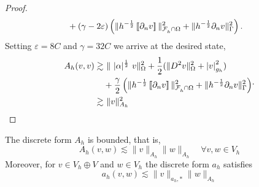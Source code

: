 \begin{proof}
\begin{equation}
\begin{split}
                       & + (\gamma - 2\varepsilon  )\left( \|h^{-\frac{1}{2}}  \left[\!\left[  \partial _{n} v  \right]\!\right]\|_{\mathcal{F} _{h}^{}\cap \Omega   }^{ 2 } + \| h^{-\frac{1}{2}} \partial _{n} v \|_{ \Gamma  }^{ 2} \right)        .
        \end{split}
    \end{equation}
    Setting $\varepsilon = 8C$ and $\gamma = 32C $ we arrive at the desired state,
    \begin{equation}
        \begin{split}
           A_{h}( v,v)  \gtrsim & \   \| \ |\alpha|^{\frac{1}{2}} \    v  \|_{  \Omega   }^{2} + \frac{1}{2}  (\| D^2 v \|_{ \Omega  }^{ 2 }  + \left\lvert  v  \right\rvert _{ g_{h} }^{2  } )  \\
                       & + \frac{\gamma }{2}\left( \|h^{-\frac{1}{2}}  \left[\!\left[  \partial _{n} v  \right]\!\right]\|_{\mathcal{F} _{h}^{}\cap \Omega   }^{ 2 } + \| h^{-\frac{1}{2}} \partial _{n} v \|_{ \Gamma  }^{ 2} \right) \\
                        \gtrsim & \  \| v \|_{ A_{h} }^{2  }
        \end{split}
.
    \end{equation}
\end{proof}


\begin{lemma}
    \label{lemma:bi_Ah_bounded}
    The discrete form $A_{h}$ is bounded, that is,
    \begin{equation}
    \label{eq:bi_A_h_bounded}
     A_{h}( v,w) \lesssim \| v \|_{A_{h}  }^{  }\| w \|_{A_{h}  }^{  } \quad   \forall v,w \in V_{h}
    \end{equation}
    Moreover, for $v \in V_{h} \oplus V$  and $w \in V_{h}$ the discrete form $a_{h}$ satisfies
    \begin{equation}
        \label{eq:bi_a_h_bounded}
        a_{h} ( v,w) \lesssim \| v \|_{ a_{h},* }^{  } \| w \|_{ A_{h} }^{  }
    \end{equation}
\end{lemma}

